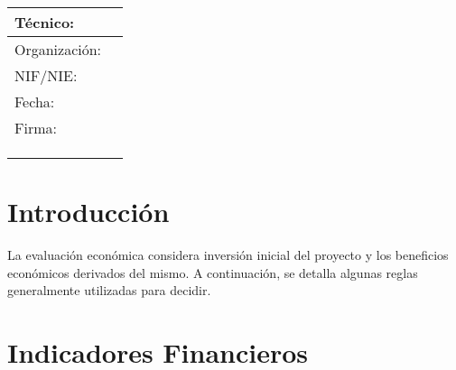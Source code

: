 \documentclass[conference,12pt]{IEEEtran}
\author{\TextField[name=Proyecto,width=16cm]{}}
\date{\today}
\let\OldTextField\TextField
\renewcommand{\TextField}[2][]{%
  \raisebox{-0.3ex}{\OldTextField[height=.85em,  bordercolor={1 1 1}, backgroundcolor={1 1 1},#1]{#2}}%
}
\begin{document}

\justifying
\begin{Form}
\maketitle
\vspace{10cm}
\begin{table}[h!]
    \centering
    \begin{tabular}{|p{2cm}|p{8cm}|}
        \hline
        Técnico: &     \TextField[name=Tecnico,width=6cm]{} 
        \\
        \hline
        Organización: &     \TextField[name=Organizacion,width=6cm]{} 
        \\
        \hline
        NIF/NIE: &    \TextField[name=NIF,width=6cm]{} 
        \\ 
        \hline
        Fecha: &    \TextField[name=Fecha,width=6cm]{} 
        \\ 
        \hline
        Firma: &     
        \\ &
        \\ &
        \\ &
        \\ \hline
    \end{tabular}
\end{table}
\newpage
\begin{abstract}
    \resumen
\end{abstract}
\tableofcontents
\newpage


\section{Introducción}

La evaluación económica considera inversión inicial del proyecto y los beneficios económicos derivados del mismo. A continuación, 
se detalla algunas reglas generalmente utilizadas para decidir.

\section{Indicadores Financieros}


\end{Form}
\end{document}
